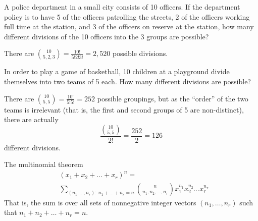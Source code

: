 \begin{changebar}
    
    \begin{example}
        A police department in a small city consists of 10 officers. If the department policy is to have 5 of the officers patrolling the streets, 2 of the officers working full time at the station, and 3 of the officers on reserve at the station, how many different divisions of the 10 officers into the 3 groups are possible?
    \end{example}
    \begin{solution}
        There are $\binom{10}{5,2,3} = \frac{10!}{5!2!3!} = 2{,}520$ possible divisions.
    \end{solution}
\end{changebar}
    
\begin{changebar}
    \begin{example}
        In order to play a game of basketball, 10 children at a playground divide themselves into two teams of 5 each. How many different divisions are possible?
    \end{example}
    \begin{solution}
        There are $\binom{10}{5,5} = \frac{10!}{5!5!} = 252$ possible groupings, but as the ``order'' of the two teams is irrelevant (that is, the first and second groups of 5 are non-distinct), there are actually \[
            \frac{\binom{10}{5,5}}{2!} = \frac{252}{2} = 126    
            \] different divisions.
        \end{solution}
\end{changebar}

\begin{bdef}{The multinomial theorem}
    \[\begin{aligned}
        &(x_1+x_2+\dots+x_r)^n = \\
        &\sum_{(n_1,\dots,n_r):\: n_1+\dots+n_r = n} \binom{n}{n_1,n_2,\dots,n_r} x_1^{n_1}x_2^{n_2}\dots x_r^{n_r}
    \end{aligned}\]
    That is, the sum is over all sets of nonnegative integer vectors $(n_1, \dots, n_r)$ such that $n_1 + n_2 + \dots + n_r = n$.
\end{bdef}